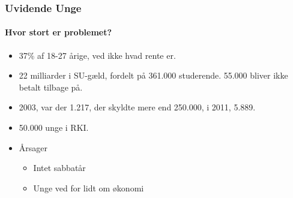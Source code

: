 
\begin{frame}
\frametitle{Uvidende Unge}
\framesubtitle{Hvor stort er problemet?} %
    \begin{itemize}
        \item{37\% af 18-27 årige, ved ikke hvad rente er.}
        \item{22 milliarder i SU-gæld, fordelt på 361.000 studerende. 55.000 bliver ikke betalt tilbage på.}
        \item{2003, var der 1.217, der skyldte mere end 250.000, i 2011, 5.889.}
        \item{50.000 unge i RKI.}
        \item{Årsager}
        	\begin{itemize}
        	\item{Intet sabbatår}
        	\item{Unge ved for lidt om økonomi}
        	\end{itemize}
    \end{itemize}
\end{frame}

